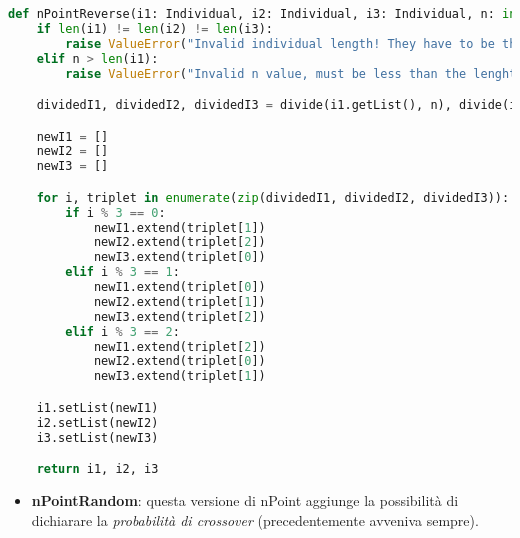 \documentclass{article}
\begin{document}
\begin{lstlisting}[language=Python]
def nPointReverse(i1: Individual, i2: Individual, i3: Individual, n: int) -> tuple[Individual, Individual, Individual]:
    if len(i1) != len(i2) != len(i3):
        raise ValueError("Invalid individual length! They have to be the same.")
    elif n > len(i1):
        raise ValueError("Invalid n value, must be less than the lenght of the individual!")

    dividedI1, dividedI2, dividedI3 = divide(i1.getList(), n), divide(i2.getList(), n), divide(i3.getList(), n)

    newI1 = []
    newI2 = []
    newI3 = []

    for i, triplet in enumerate(zip(dividedI1, dividedI2, dividedI3)):
        if i % 3 == 0:
            newI1.extend(triplet[1])
            newI2.extend(triplet[2])
            newI3.extend(triplet[0])
        elif i % 3 == 1:
            newI1.extend(triplet[0])
            newI2.extend(triplet[1])
            newI3.extend(triplet[2])
        elif i % 3 == 2:
            newI1.extend(triplet[2])
            newI2.extend(triplet[0])
            newI3.extend(triplet[1])

    i1.setList(newI1)
    i2.setList(newI2)
    i3.setList(newI3)

    return i1, i2, i3
        \end{lstlisting}

        \pagebreak

\begin{itemize}
\item\textbf{nPointRandom}: questa versione di nPoint aggiunge la possibilità di dichiarare la \textit{probabilità di crossover} (precedentemente avveniva sempre).
\end{itemize}
\end{document}
